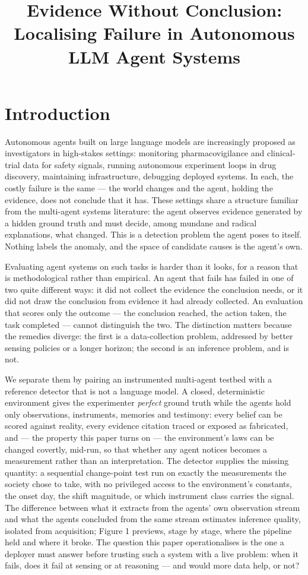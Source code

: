 \documentclass[pdflatex,sn-basic]{sn-jnl}
\title[Evidence Without Conclusion]{Evidence Without Conclusion: Localising Failure in Autonomous LLM Agent Systems}
\author*[1]{\fnm{Nick} \sur{Lamb}}\email{nick@pharmatools.ai}
\affil*[1]{\orgname{Independent Researcher}, \orgaddress{\city{Oxford}, \country{United Kingdom}}}
\begin{document}
\maketitle

\hypertarget{introduction}{%
\section{Introduction}\label{introduction}}

Autonomous agents built on large language models are increasingly proposed as investigators
in high-stakes settings: monitoring pharmacovigilance and clinical-trial data for safety
signals, running autonomous experiment loops in drug discovery, maintaining infrastructure,
debugging deployed systems. In each, the costly failure is the same --- the world changes and
the agent, holding the evidence, does not conclude that it has. These settings share a
structure familiar from the multi-agent systems literature:
the agent observes evidence generated by a hidden ground truth and must decide, among mundane
and radical explanations, what changed. This is a detection problem the agent poses to itself.
Nothing labels the anomaly, and the space of candidate causes is the agent's own.

Evaluating agent systems on such tasks is harder than it looks, for a reason that is
methodological rather than empirical. An agent that fails has failed in one of two quite
different ways: it did not collect the evidence the conclusion needs, or it did not draw the
conclusion from evidence it had already collected. An evaluation that scores only the
outcome --- the conclusion reached, the action taken, the task completed --- cannot distinguish
the two. The distinction matters because the remedies
diverge: the first is a data-collection problem, addressed by better sensing policies or a
longer horizon; the second is an inference problem, and is not.

We separate them by pairing an instrumented multi-agent testbed with a reference detector that
is not a language model. A closed, deterministic environment gives the experimenter \emph{perfect}
ground truth while the agents hold only observations, instruments, memories and testimony:
every belief can be scored against reality, every evidence citation traced or exposed as
fabricated, and --- the property this paper turns on --- the environment's laws can be changed
covertly, mid-run, so that whether any agent notices becomes a measurement rather than an
interpretation. The detector supplies the missing quantity: a sequential change-point test run
on exactly the measurements the society chose to take, with no privileged access to the
environment's constants, the onset day, the shift magnitude, or which instrument class carries
the signal. The difference between what it extracts from the agents' own observation stream
and what the agents concluded from the same stream estimates inference quality, isolated from
acquisition; Figure 1 previews, stage by stage, where the pipeline held and where it broke.
The question this paper operationalises is the one a deployer must answer before
trusting such a system with a live problem: when it fails, does it fail at sensing or at
reasoning --- and would more data help, or not?
\end{document}
